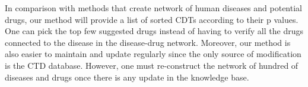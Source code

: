 In comparison with methods that create network of human diseases and potential drugs, our method will provide a list of sorted CDTs according to their p values. One can pick the top few suggested drugs instead of having to verify all the drugs connected to the disease in the disease-drug network. Moreover, our method is also easier to maintain and update regularly since the only source of modification is the CTD database. However, one must re-construct the network of hundred of diseases and drugs once there is any update in the knowledge base.
%



